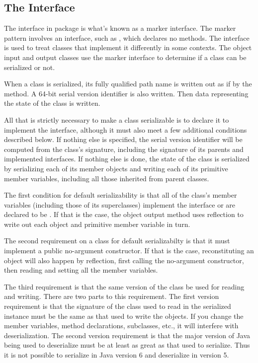 \subsection{The  Interface}\label{section:io-serializable}

The  interface in package  is what's
known as a marker interface.  The marker pattern involves an
interface, such as , which declares no methods.
The interface is used to treat classes that implement it differently
in some contexts.  The object input and output classes use the
 marker interface to determine if a class can be
serialized or not.

When a class is serialized, its fully qualified path name is written
out as if by the  method.  A 64-bit serial version
identifier is also written.  Then data representing the state of
the class is written.

All that is strictly necessary to make a class serializable is to
declare it to implement the  interface, although it
must also meet a few additional conditions described below.  If
nothing else is specified, the serial version identifier will be
computed from the class's signature, including the signature of its
parents and implemented interfaces.  If nothing else is done, the
state of the class is serialized by serializing each of its member
objects and writing each of its primitive member variables, including
all those inherited from parent classes.

The first condition for default serializability is that all of the
class's member variables (including those of its superclasses)
implement the  interface or are declared to be
.  If that is the case, the object output method uses
reflection to write out each object and primitive member variable in
turn.  

The second requirement on a class for default serializabilty is that
it must implement a public no-argument constructor.  If that is the
case, reconstituting an object will also happen by reflection, first
calling the no-argument constructor, then reading and setting all the
member variables.

The third requirement is that the same version of the class be used
for reading and writing.  There are two parts to this requirement.
The first version requirement is that the signature of the class used
to read in the serialized instance must be the same as that used to
write the objects.  If you change the member variables, method
declarations, subclasses, etc., it will interfere with
deserialization.  The second version requirement is that the major
version of Java being used to deserialize must be at least as great
as that used to serialize.  Thus it is not possible to serialize in
Java version 6 and deserialize in version 5.



